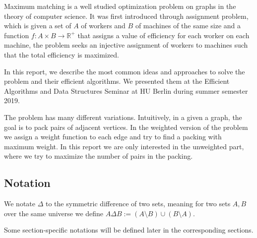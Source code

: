Maximum matching is a well studied optimization problem on graphs in the theory of computer science. It was first introduced through assignment problem, which is given a set of $A$ of workers and $B$ of machines of the same size and a function $f:A\times B \rightarrow \mathbb{R}^{+}$ that assigns a value of efficiency for each worker on each machine, the problem seeks an injective assignment of workers to machines such that the total efficiency is maximized.

In this report, we describe the most common ideas and approaches to solve the problem and their efficient algorithms. We presented them at the Efficient Algorithms and Data Structures Seminar at HU Berlin during summer semester 2019.

The problem has many different variations. Intuitively, in a given a graph, the goal is to pack pairs of adjacent vertices. In the weighted version of the problem we assign a weight function to each edge and try to find a packing with maximum weight. In this report we are only interested in the unweighted part, where we try to maximize the number of pairs in the packing.

\subsection{Notation}
We notate $\Delta$  to the symmetric difference of two sets, meaning for two sets $A, B$ over the same universe we define $A\Delta B := \left( A \setminus B \right) \cup \left( B \setminus A \right)$.

Some section-specific notations will be defined later in the corresponding sections.
